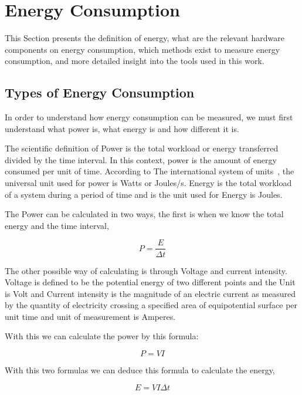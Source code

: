 \section{Energy Consumption}
\label{sc:energyconsumption}

This Section presents the definition of energy, what are the relevant hardware components on energy consumption, which methods exist to measure energy consumption, and more detailed insight into the tools used in this work.

\subsection{Types of Energy Consumption} \label{energypower} 
In order to understand how energy consumption can be measured, we must first understand what power is, what energy is and how different it is.

The scientific definition of Power is the total workload or energy transferred divided by the time interval. In this context, power is the amount of energy consumed per unit of time. According to The international system of units~\cite{taylor_1991}, the universal unit used for power is Watts or Joules/s. Energy is the total workload of a system during a period of time and is the unit used for Energy is Joules.

The Power can be calculated in two ways, the first is when we know the total energy and the time interval,

\begin{equation}
P = \frac{E}{\Delta t} 
\end{equation}

The other possible way of calculating is through Voltage and current intensity. Voltage is defined to be the potential energy of two different points and the Unit is Volt and Current intensity is the magnitude of an electric current as measured by the quantity of electricity crossing a specified area of equipotential surface per unit time and unit of measurement is Amperes. 

With this we can calculate the power by this formula:

\begin{equation}\label{eq:pvi}
P = V I
\end{equation}

With this two formulas we can deduce this formula to calculate the energy,

\begin{equation}\label{eq:energyfinal}
E = V I \Delta t
\end{equation}

